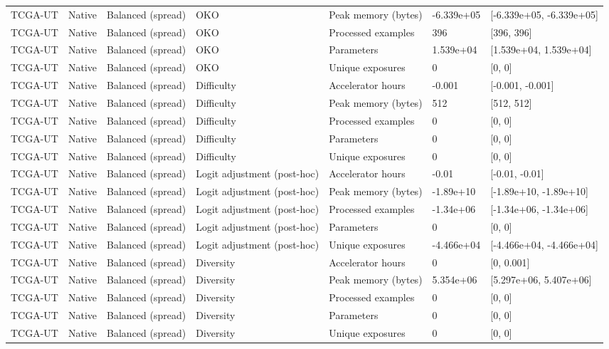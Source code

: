 \begin{longtable}{lllllll}
TCGA-UT & Native & Balanced (spread) & OKO & Peak memory (bytes) & -6.339e+05 & [-6.339e+05, -6.339e+05] \\
TCGA-UT & Native & Balanced (spread) & OKO & Processed examples & 396 & [396, 396] \\
TCGA-UT & Native & Balanced (spread) & OKO & Parameters & 1.539e+04 & [1.539e+04, 1.539e+04] \\
TCGA-UT & Native & Balanced (spread) & OKO & Unique exposures & 0 & [0, 0] \\
TCGA-UT & Native & Balanced (spread) & Difficulty & Accelerator hours & -0.001 & [-0.001, -0.001] \\
TCGA-UT & Native & Balanced (spread) & Difficulty & Peak memory (bytes) & 512 & [512, 512] \\
TCGA-UT & Native & Balanced (spread) & Difficulty & Processed examples & 0 & [0, 0] \\
TCGA-UT & Native & Balanced (spread) & Difficulty & Parameters & 0 & [0, 0] \\
TCGA-UT & Native & Balanced (spread) & Difficulty & Unique exposures & 0 & [0, 0] \\
TCGA-UT & Native & Balanced (spread) & Logit adjustment (post-hoc) & Accelerator hours & -0.01 & [-0.01, -0.01] \\
TCGA-UT & Native & Balanced (spread) & Logit adjustment (post-hoc) & Peak memory (bytes) & -1.89e+10 & [-1.89e+10, -1.89e+10] \\
TCGA-UT & Native & Balanced (spread) & Logit adjustment (post-hoc) & Processed examples & -1.34e+06 & [-1.34e+06, -1.34e+06] \\
TCGA-UT & Native & Balanced (spread) & Logit adjustment (post-hoc) & Parameters & 0 & [0, 0] \\
TCGA-UT & Native & Balanced (spread) & Logit adjustment (post-hoc) & Unique exposures & -4.466e+04 & [-4.466e+04, -4.466e+04] \\
TCGA-UT & Native & Balanced (spread) & Diversity & Accelerator hours & 0 & [0, 0.001] \\
TCGA-UT & Native & Balanced (spread) & Diversity & Peak memory (bytes) & 5.354e+06 & [5.297e+06, 5.407e+06] \\
TCGA-UT & Native & Balanced (spread) & Diversity & Processed examples & 0 & [0, 0] \\
TCGA-UT & Native & Balanced (spread) & Diversity & Parameters & 0 & [0, 0] \\
TCGA-UT & Native & Balanced (spread) & Diversity & Unique exposures & 0 & [0, 0] \\

\end{longtable}
